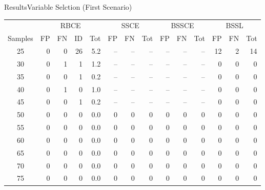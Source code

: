 \documentclass[aspectratio=169]{beamer}					%
\begin{document}
\begin{frame}{Results}{Variable Selction (First Scenario)}

\begin{table}[h]
    \centering
    \begin{tabular}{|c||rrr|r||rr|r||rr|r||rr|r|}
  \hline
  &\multicolumn{4}{c||}{RBCE}&\multicolumn{3}{c||}{SSCE}
  &\multicolumn{3}{c||}{BSSCE}&\multicolumn{3}{c|}{BSSL}\\
  \cline{2-14}
 Samples & FP & FN & ID & Tot & FP & FN & Tot & FP & FN & Tot & FP & FN & Tot \\ 
  \hline
25 &   0 &   0 &  26 & 5.2 & -- & -- & -- & -- & -- & -- &  12 &   2 & 14\\ 
  30 &   0 &   1 &   1 & 1.2 & -- & -- & -- & -- & -- & -- &   0 &   0 & 0\\ 
  35 &   0 &   0 &   1 & 0.2 & -- & -- & -- & -- & -- & -- &   0 &   0 & 0\\ 
  40 &   0 &   1 &   0 & 1.0 &-- & -- & -- & -- & -- & -- &   0 &   0 & 0\\ 
  45 &   0 &   0 &   1 & 0.2 & -- & -- & -- & -- & -- & -- &   0 &   0 & 0\\ 
  50 &   0 &   0 &   0 & 0.0 &  0 &   0  & 0 &   0 &   0  & 0 &   0 &   0  & 0\\ 
  55 &   0 &   0 &   0 & 0.0 &   0 &   0 &   0  & 0 &   0  & 0 &   0 &   0  & 0\\ 
  60 &   0 &   0 &   0 & 0.0 &   0 &   0 &   0 &   0  & 0  & 0 &   0 &   0  & 0\\ 
  65 &   0 &   0 &   0 & 0.0 &   0 &   0 &   0 &   0 &   0  & 0  & 0 &   0  & 0\\ 
  70 &   0 &   0 &   0 & 0.0 &   0 &   0 &   0 &   0 &   0  & 0  & 0 &   0  & 0\\ 
  75 &   0 &   0 &   0 & 0.0 &   0 &   0 &   0 &   0 &   0  & 0  & 0 &   0  & 0\\ 
   \hline
\end{tabular}

\end{table}
\end{frame}
\end{document}
